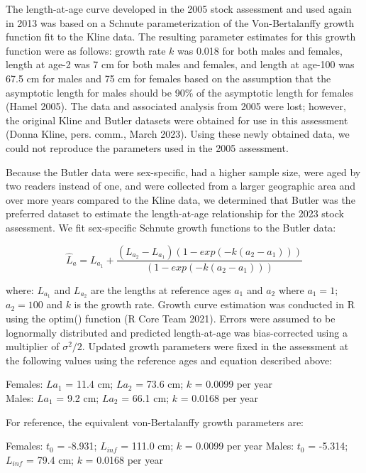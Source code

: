 \documentclass[11pt,
  english,
  letterpaper,
]{article}
\begin{document}
The length-at-age curve developed in the 2005 stock assessment and used again in 2013 was based on a Schnute parameterization of the Von-Bertalanffy growth function fit to the Kline data. The resulting parameter estimates for this growth function were as follows: growth rate \(k\) was 0.018 for both males and females, length at age-2 was 7 cm for both males and females, and length at age-100 was 67.5 cm for males and 75 cm for females based on the assumption that the asymptotic length for males should be 90\% of the asymptotic length for females (Hamel 2005). The data and associated analysis from 2005 were lost; however, the original Kline and Butler datasets were obtained for use in this assessment (Donna Kline, pers. comm., March 2023). Using these newly obtained data, we could not reproduce the parameters used in the 2005 assessment.

Because the Butler data were sex-specific, had a higher sample size, were aged by two readers instead of one, and were collected from a larger geographic area and over more years compared to the Kline data, we determined that Butler was the preferred dataset to estimate the length-at-age relationship for the 2023 stock assessment. We fit sex-specific Schnute growth functions to the Butler data:

\begin{equation} \hat{L}_{a} = L_{a_{1}}+\frac{(L_{a_{2}}-L_{a_{1}})(1-exp(-k(a_{2}-a_{1})))}{(1-exp(-k(a_{2}-a_{1})))}\end{equation}

where: \(L_{a_{1}}\) and \(L_{a_{2}}\) are the lengths at reference ages \(a_{1}\) and \(a_{2}\) where \(a_{1}=1\); \(a_{2}=100\) and \(k\) is the growth rate. Growth curve estimation was conducted in R using the optim() function (R Core Team 2021). Errors were assumed to be lognormally distributed and predicted length-at-age was bias-corrected using a multiplier of \(\sigma^2/2\). Updated growth parameters were fixed in the assessment at the following values using the reference ages and equation described above:

Females: \(L{a_{1}}\) = 11.4 cm; \(L{a_{2}}\) = 73.6 cm; \(k\) = 0.0099 per year\\
Males: \(L{a_{1}}\) = 9.2 cm; \(L{a_{2}}\) = 66.1 cm; \(k\) = 0.0168 per year

For reference, the equivalent von-Bertalanffy growth parameters are:

Females: \(t{_0}\) = -8.931; \(L{_{inf}}\) = 111.0 cm; \(k\) = 0.0099 per year Males: \(t{_0}\) = -5.314; \(L{_{inf}}\) = 79.4 cm; \(k\) = 0.0168 per year
\end{document}
